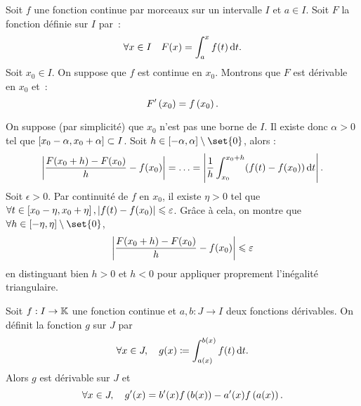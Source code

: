 \documentclass{magnolia}
\begin{document}
\begin{preuve}
Soit $f$ une fonction continue par morceaux sur un intervalle $I$ et
$a\in I$. Soit $F$ la fonction définie sur $I$ par~:
\[\forall x\in I \quad F(x)=\int_{a}^{x} f(t)\,\text{d}t.\]
Soit $x_0\in I$. On suppose que $f$ est continue en $x_0$. Montrons que $F$ est dérivable en $x_0$
et~:
\[F'\left(x_0\right)=f\left(x_0\right).\]

On suppose (par simplicité) que $x_0$ n'est pas une borne de $I$. Il existe donc $\alpha>0$ tel que $\left[x_0-\alpha,x_0+\alpha\right]\subset I$. Soit $h\in \interf{-\alpha}{\alpha}\setminus\set{0}$, alors :
$$\left|\frac{F(x_0+h)-F(x_0)}{h}-f(x_0)\right|=\ldots=\left|\frac{1}{h}\int_{x_0}^{x_0+h} (f(t)-f(x_0))\,\text{d}t\right|.$$
Soit $\epsilon>0$. Par continuité de $f$ en $x_0$, il existe $\eta>0$ tel que $\forall t \in \left[x_0-\eta,x_0+\eta\right], \left|f(t)-f(x_0)\right|\leqslant \varepsilon$. Grâce à cela, on montre que $\forall h \in \interf{-\eta}{\eta}\setminus\set{0}$, $$\left|\frac{F(x_0+h)-F(x_0)}{h}-f(x_0)\right|\leqslant \varepsilon$$ en distinguant bien $h>0$ et $h<0$ pour appliquer proprement l'inégalité triangulaire.

\end{preuve}

\begin{remarqueUnique}
\remarque[utile=-3] Soit $f:I\to\mathbb{K}$ une fonction continue et $a,b:J\to I$ deux
  fonctions dérivables. On définit la
  fonction $g$ sur $J$ par
  \[\forall x\in J ,\quad g(x)\coloneqq\int_{a(x)}^{b(x)} f(t)\,\text{d}t.\]
  Alors $g$ est dérivable sur $J$ et
  \[\forall x\in J ,\quad g'(x)=b'(x)f\left(b(x)\right)-a'(x)f\left(a(x)\right).\]
\end{remarqueUnique}



\end{document}
